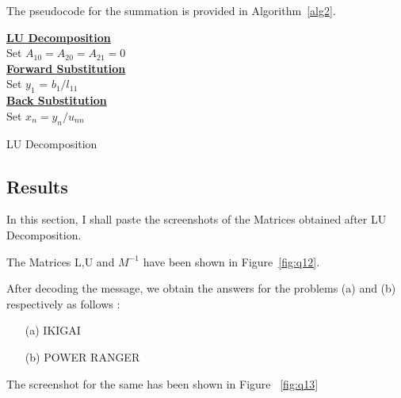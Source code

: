 \documentclass[titlepage, 11pt]{article}
\begin{document}
The pseudocode for the summation is provided in Algorithm~\ref{alg2}.
\begin{center}
\begin{algorithm}[H]\label{alg2}

\SetAlgoLined
{
\underline{\textbf{LU Decomposition}} \\
{
Set $A_{10}=A_{20}=A_{21}=0$ \\
}
\underline{\textbf{Forward Substitution}} \\ 
  Set $y_1$ = $b_1/l_{11}$ \\
\underline{\textbf{Back Substitution}} \\{
    Set $x_n = {y_n}/{u_{nn}}$ \\
}
}
 \caption{LU Decomposition}
\end{algorithm}    
\end{center}

\subsection{Results}

In this section, I shall paste the screenshots of the Matrices obtained after LU Decomposition.  

The Matrices L,U and $M^{-1}$ have been shown in Figure~\ref{fig:q12}. 

After decoding the message, we obtain the answers for the problems (a) and (b) respectively as follows :
\begin{itemize}
    \item [(a)] IKIGAI
    \item [(b)] POWER RANGER
\end{itemize}
The screenshot for the same has been shown in Figure ~\ref{fig:q13}
\end{document}

